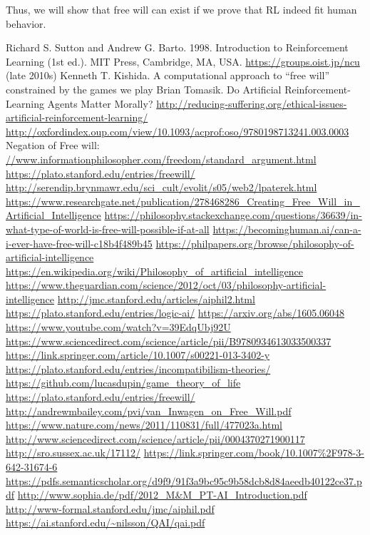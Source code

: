 \documentclass[a4]{article}
\begin{document}
Thus, we will show that free will can exist if we prove that RL indeed fit human behavior.

\begin{thebibliography}{20}
 Richard S. Sutton and Andrew G. Barto. 1998. Introduction to Reinforcement Learning (1st ed.). MIT Press, Cambridge, MA, USA.
 \url{https://groups.oist.jp/ncu} (late 2010s)
 Kenneth T. Kishida. A computational approach to “free will” constrained by the games we play
 Brian Tomasik. Do Artificial Reinforcement-Learning Agents Matter Morally?
 \url{http://reducing-suffering.org/ethical-issues-artificial-reinforcement-learning/}
 \url{http://oxfordindex.oup.com/view/10.1093/acprof:oso/9780198713241.003.0003}
 Negation of Free will: \url{//www.informationphilosopher.com/freedom/standard_argument.html}
 \url{https://plato.stanford.edu/entries/freewill/}
 \url{http://serendip.brynmawr.edu/sci_cult/evolit/s05/web2/lpaterek.html}
 \url{https://www.researchgate.net/publication/278468286_Creating_Free_Will_in_Artificial_Intelligence}
 \url{https://philosophy.stackexchange.com/questions/36639/in-what-type-of-world-is-free-will-possible-if-at-all}
 \url{https://becominghuman.ai/can-a-i-ever-have-free-will-c18b4f489b45}
 \url{https://philpapers.org/browse/philosophy-of-artificial-intelligence}
 \url{https://en.wikipedia.org/wiki/Philosophy_of_artificial_intelligence}
 \url{https://www.theguardian.com/science/2012/oct/03/philosophy-artificial-intelligence}
 \url{http://jmc.stanford.edu/articles/aiphil2.html}
 \url{https://plato.stanford.edu/entries/logic-ai/}
 \url{https://arxiv.org/abs/1605.06048}
 \url{https://www.youtube.com/watch?v=39EdqUbj92U}
 \url{https://www.sciencedirect.com/science/article/pii/B9780934613033500337}
 \url{https://link.springer.com/article/10.1007/s00221-013-3402-y}
 \url{https://plato.stanford.edu/entries/incompatibilism-theories/}
 \url{https://github.com/lucasdupin/game_theory_of_life}
 \url{https://plato.stanford.edu/entries/freewill/}
 \url{http://andrewmbailey.com/pvi/van_Inwagen_on_Free_Will.pdf}
 \url{https://www.nature.com/news/2011/110831/full/477023a.html}
 \url{http://www.sciencedirect.com/science/article/pii/0004370271900117}
 \url{http://sro.sussex.ac.uk/17112/}
 \url{https://link.springer.com/book/10.1007\%2F978-3-642-31674-6}
 \url{https://pdfs.semanticscholar.org/d9f9/91f3a9bc95c9b58dcb8d84aeedb40122ce37.pdf}
 \url{http://www.sophia.de/pdf/2012_M&M_PT-AI_Introduction.pdf}
 \url{http://www-formal.stanford.edu/jmc/aiphil.pdf}
 \url{https://ai.stanford.edu/~nilsson/QAI/qai.pdf}
\end{thebibliography}
\end{document}
